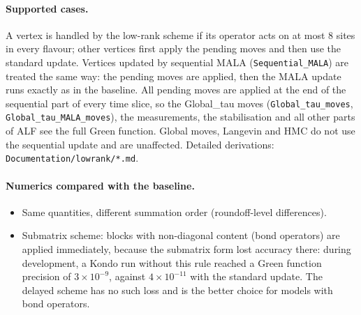 \paragraph{Supported cases.}
A vertex is handled by the low-rank scheme if its operator acts on at most 8 sites in every flavour;
other vertices first apply the pending moves and then use the standard update. Vertices updated by
sequential MALA (\texttt{Sequential\_MALA}) are treated the same way: the pending moves are applied,
then the MALA update runs exactly as in the baseline. All pending moves are applied at the end of the
sequential part of every time slice, so the Global\_tau moves (\texttt{Global\_tau\_moves},
\texttt{Global\_tau\_MALA\_moves}), the measurements, the stabilisation and all other parts of ALF see
the full Green function. Global moves, Langevin and HMC do not use the sequential update and are
unaffected. Detailed derivations: \texttt{Documentation/lowrank/*.md}.

\paragraph{Numerics compared with the baseline.}
\begin{itemize}
\item Same quantities, different summation order (roundoff-level differences).
\item Submatrix scheme: blocks with non-diagonal content (bond operators) are applied immediately,
because the submatrix form lost accuracy there: during development, a Kondo run without this rule
reached a Green function precision of $3\times10^{-9}$, against $4\times10^{-11}$ with the standard
update. The delayed scheme has no such loss and is the better choice for models with bond operators.
\end{itemize}

